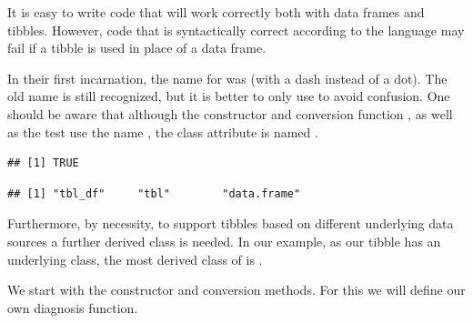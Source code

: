 \documentclass[krantz2]{krantz}\usepackage{knitr}%
\begin{document}
\begin{warningbox}
It is easy to write code that will work correctly both with data frames and tibbles. However, code that is syntactically correct according to the \Rlang language may fail if a tibble is used in place of a data frame.
\end{warningbox}

\begin{infobox}
In their first incarnation, the name for  was  (with a dash instead of a dot). The old name is still recognized, but it is better to only use  to avoid confusion. One should be aware that although the constructor  and conversion function , as well as the test  use the name , the class attribute is named .

\begin{knitrout}\footnotesize
{}\color{fgcolor}\begin{kframe}
\begin{alltt}
 \hlkwb{<-} \hlstd{(} \hlstd{=} \hlopt{:}\hlstd{)}
\end{alltt}
\begin{verbatim}
## [1] TRUE
\end{verbatim}
\begin{alltt}
\end{alltt}
\begin{verbatim}
## [1] "tbl_df"     "tbl"        "data.frame"
\end{verbatim}
\end{kframe}
\end{knitrout}

Furthermore, by necessity, to support tibbles based on different underlying data sources a further derived class is needed. In our example, as our tibble has an underlying  class, the most derived class of  is .
\end{infobox}

We start with the constructor and conversion methods. For this we will define our own diagnosis function.

\begin{knitrout}\footnotesize
{}\color{fgcolor}\begin{kframe}
\begin{alltt}
 \hlkwb{<-} \hlstd{(}\hlstd{) \{}
  \hlstd{(}
    \hlstd{(}\hlstd{(}\hlstd{(x)[}\hlstd{],}
    \hlstd{),}
    \hlstd{(}
            \hlstd{=} \hlstd{,}  \hlstd{=} \hlstd{),}
     \hlstd{=} \hlstd{)}
    \hlstd{)}
\hlstd{\}}
\end{alltt}
\end{kframe}
\end{knitrout}
\end{document}
